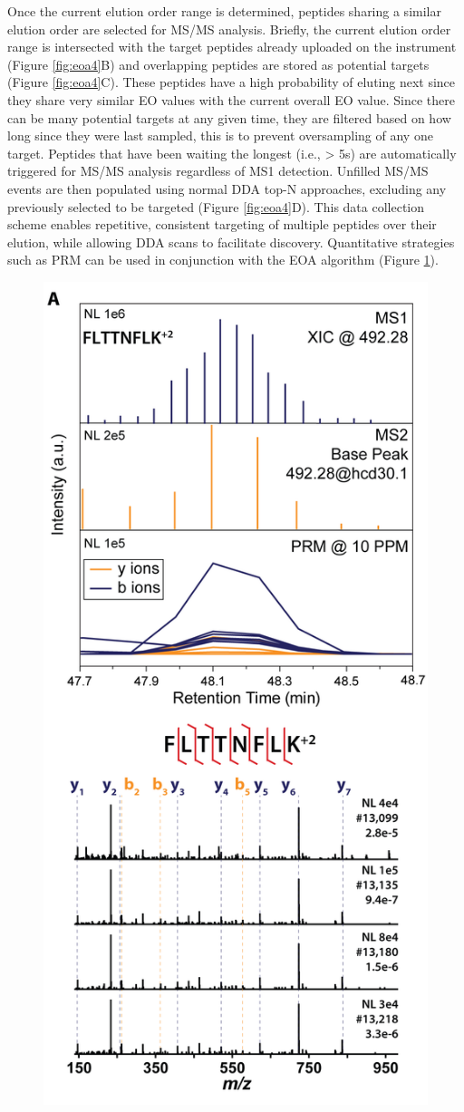 Once the current elution order range is determined, peptides sharing a similar elution order are selected for MS/MS analysis. Briefly, the current elution order range is intersected with the target peptides already uploaded on the instrument (Figure \ref{fig:eoa4}B) and overlapping peptides are stored as potential targets (Figure \ref{fig:eoa4}C). These peptides have a high probability of eluting next since they share very similar EO values with the current overall EO value. Since there can be many potential targets at any given time, they are filtered based on how long since they were last sampled, this is to prevent oversampling of any one target. Peptides that have been waiting the longest (i.e., > 5s) are automatically triggered for MS/MS analysis regardless of MS1 detection. Unfilled MS/MS events are then populated using normal DDA top-N approaches, excluding any \mz{} previously selected to be targeted (Figure \ref{fig:eoa4}D). This data collection scheme enables repetitive, consistent targeting of multiple peptides over their elution, while allowing DDA scans to facilitate discovery. Quantitative strategies such as PRM can be used in conjunction with the EOA algorithm (Figure \ref{fig:eoas4}).
\begin{figure}[p]
	\centering
	\includegraphics[width=0.6\columnwidth]{eoa/EOA S4.png}
	\label{fig:eoas4}
\end{figure}  


